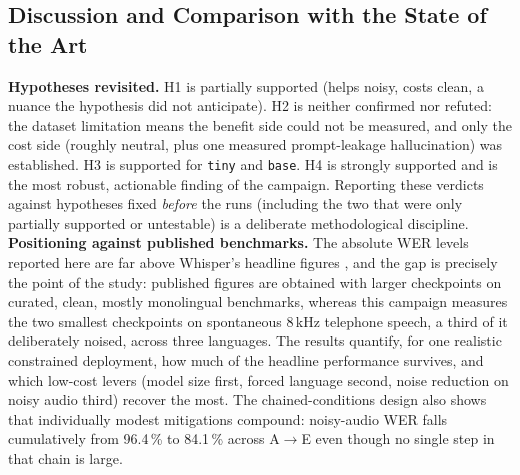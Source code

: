 \documentclass[12pt]{report}
\begin{document}
\subsection{Discussion and Comparison with the State of the Art}
\textbf{Hypotheses revisited.} H1 is partially supported (helps noisy, costs clean, a nuance the hypothesis did not anticipate). H2 is neither confirmed nor refuted: the dataset limitation means the benefit side could not be measured, and only the cost side (roughly neutral, plus one measured prompt-leakage hallucination) was established. H3 is supported for \texttt{tiny} and \texttt{base}. H4 is strongly supported and is the most robust, actionable finding of the campaign. Reporting these verdicts against hypotheses fixed \emph{before} the runs (including the two that were only partially supported or untestable) is a deliberate methodological discipline.
\textbf{Positioning against published benchmarks.} The absolute WER levels reported here are far above Whisper's headline figures \cite{radford2023robust}, and the gap is precisely the point of the study: published figures are obtained with larger checkpoints on curated, clean, mostly monolingual benchmarks, whereas this campaign measures the two smallest checkpoints on spontaneous 8\,kHz telephone speech, a third of it deliberately noised, across three languages. The results quantify, for one realistic constrained deployment, how much of the headline performance survives, and which low-cost levers (model size first, forced language second, noise reduction on noisy audio third) recover the most. The chained-conditions design also shows that individually modest mitigations compound: noisy-audio WER falls cumulatively from 96.4\,\% to 84.1\,\% across A$\to$E even though no single step in that chain is large.
\end{document}

